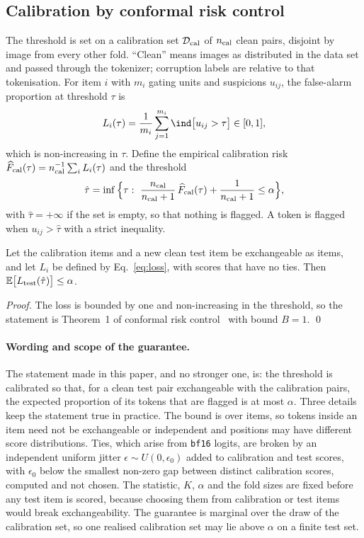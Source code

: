 \subsection{Calibration by conformal risk control}\label{ssec:calibration}
The threshold is set on a calibration set $\mathcal D_{\rm cal}$ of $n_{\rm cal}$ clean pairs, disjoint by image from every other fold.
``Clean'' means images as distributed in the data set and passed through the tokenizer; corruption labels are relative to
that tokenisation.
For item $i$ with $m_i$ gating units and suspicions $u_{ij}$, the false-alarm proportion at threshold $\tau$ is
\begin{equation}
L_i(\tau)=\frac1{m_i}\sum_{j=1}^{m_i}\ind\big[u_{ij}>\tau\big]\in[0,1],
\label{eq:loss}
\end{equation}
which is non-increasing in $\tau$.
Define the empirical calibration risk $\widehat F_{\rm cal}(\tau)=n_{\rm cal}^{-1}\sum_i L_i(\tau)$ and the threshold
\begin{equation}
\hat\tau=\inf\Big\{\tau:\ \frac{n_{\rm cal}}{n_{\rm cal}+1}\,\widehat F_{\rm cal}(\tau)+\frac1{n_{\rm cal}+1}\le\alpha\Big\},
\label{eq:crc}
\end{equation}
with $\hat\tau=+\infty$ if the set is empty, so that nothing is flagged.
A token is flagged when $u_{ij}>\hat\tau$ with a strict inequality.

\begin{proposition}\label{prop:crc}
Let the calibration items and a new clean test item be exchangeable as items, and let $L_i$ be defined by
Eq.~\eqref{eq:loss}, with scores that have no ties.
Then $\mathbb{E}\big[L_{\rm test}(\hat\tau)\big]\le\alpha$.
\end{proposition}
\noindent\emph{Proof.} The loss is bounded by one and non-increasing in the threshold, so the statement is Theorem~1 of
conformal risk control~\cite{angelopoulos2024crc} with bound $B=1$. \qed

\paragraph{Wording and scope of the guarantee.}
The statement made in this paper, and no stronger one, is: the threshold is calibrated so that, for a clean test pair
exchangeable with the calibration pairs, the expected proportion of its tokens that are flagged is at most $\alpha$.
Three details keep the statement true in practice.
The bound is over items, so tokens inside an item need not be exchangeable or independent and positions may have different
score distributions.
Ties, which arise from \texttt{bf16} logits, are broken by an independent uniform jitter $\epsilon\sim U(0,\epsilon_0)$ added to
calibration and test scores, with $\epsilon_0$ below the smallest non-zero gap between distinct calibration scores, computed
and not chosen.
The statistic, $K$, $\alpha$ and the fold sizes are fixed before any test item is scored, because choosing them from calibration
or test items would break exchangeability.
The guarantee is marginal over the draw of the calibration set, so one realised calibration set may lie above $\alpha$ on a
finite test set.

